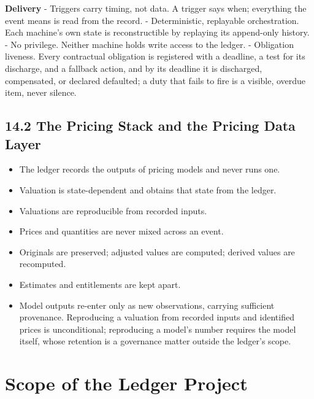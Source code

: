 \documentclass[11pt,a4paper]{article}
\newcommand{\clabel}[1]{\leavevmode\hypertarget{clause-#1}{}%
  \marginpar{\raggedright\scriptsize\ttfamily\textcolor{gray}{#1}}}
\providecommand{\tightlist}{\setlength{\itemsep}{2pt}\setlength{\parskip}{0pt}}
\begin{document}
\textbf{Delivery} - \clabel{C-14.5}Triggers carry timing, not data. A trigger says
when; everything the event means is read from the record. -
\clabel{C-14.6}Deterministic, replayable orchestration. Each machine's own state is
reconstructible by replaying its append-only history. - \clabel{C-14.7}No privilege.
Neither machine holds write access to the ledger. - \clabel{C-14.8}Obligation liveness.
Every contractual obligation is registered with a deadline, a test for
its discharge, and a fallback action, and by its deadline it is
discharged, compensated, or declared defaulted; a duty that fails to
fire is a visible, overdue item, never silence.

\hypertarget{the-pricing-stack-and-the-pricing-data-layer}{%
\subsection{14.2 The Pricing Stack and the Pricing Data
Layer}\label{the-pricing-stack-and-the-pricing-data-layer}}

\begin{itemize}
\tightlist
\item
  \clabel{C-14.9}The ledger records the outputs of pricing models and never runs one.
\item
  \clabel{C-14.10}Valuation is state-dependent and obtains that state from the ledger.
\item
  \clabel{C-14.11}Valuations are reproducible from recorded inputs.
\item
  \clabel{C-14.12}Prices and quantities are never mixed across an event.
\item
  \clabel{C-14.13}Originals are preserved; adjusted values are computed; derived values
  are recomputed.
\item
  \clabel{C-14.14}Estimates and entitlements are kept apart.
\item
  \clabel{C-14.15}Model outputs re-enter only as new observations, carrying sufficient
  provenance. Reproducing a valuation from recorded inputs and
  identified prices is unconditional; reproducing a model's number
  requires the model itself, whose retention is a governance matter
  outside the ledger's scope.
\end{itemize}

\hypertarget{scope-of-the-ledger-project}{%
\section{Scope of the Ledger
Project}\label{scope-of-the-ledger-project}}
\end{document}
